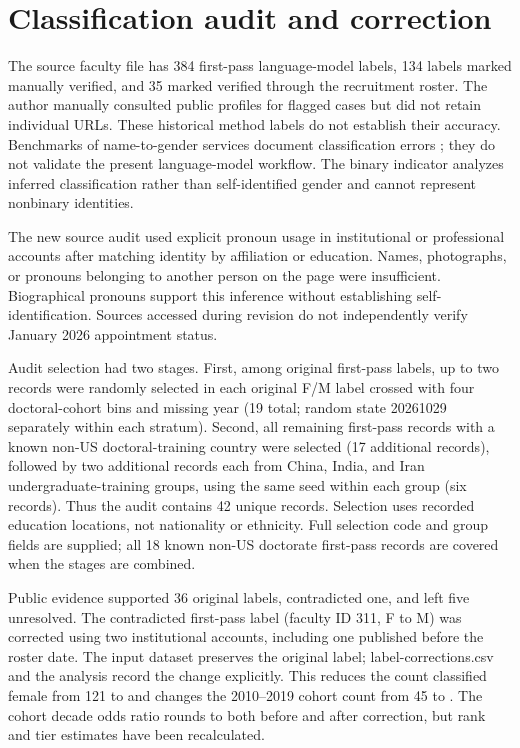 \documentclass[11pt]{article}
\begin{document}
\begin{table}[ht]\centering\small
\caption{Searched institutions with no transportation faculty identified under the study criteria.}

\end{table}

\section{Classification audit and correction}\label{sec:audit}
The source faculty file has 384 first-pass language-model labels, 134 labels marked manually verified, and 35 marked verified through the recruitment roster. The author manually consulted public profiles for flagged cases but did not retain individual URLs. These historical method labels do not establish their accuracy. Benchmarks of name-to-gender services document classification errors \citep{santamaria2018}; they do not validate the present language-model workflow. The binary indicator analyzes inferred classification rather than self-identified gender and cannot represent nonbinary identities.

The new source audit used explicit pronoun usage in institutional or professional accounts after matching identity by affiliation or education. Names, photographs, or pronouns belonging to another person on the page were insufficient. Biographical pronouns support this inference without establishing self-identification. Sources accessed during revision do not independently verify January 2026 appointment status.

Audit selection had two stages. First, among original first-pass labels, up to two records were randomly selected in each original F/M label crossed with four doctoral-cohort bins and missing year (19 total; random state 20261029 separately within each stratum). Second, all remaining first-pass records with a known non-US doctoral-training country were selected (17 additional records), followed by two additional records each from China, India, and Iran undergraduate-training groups, using the same seed within each group (six records). Thus the audit contains 42 unique records. Selection uses recorded education locations, not nationality or ethnicity. Full selection code and group fields are supplied; all 18 known non-US doctorate first-pass records are covered when the stages are combined.

Public evidence supported 36 original labels, contradicted one, and left five unresolved. The contradicted first-pass label (faculty ID 311, F to M) was corrected using two institutional accounts, including one published before the roster date. The input dataset preserves the original label; label-corrections.csv and the analysis record the change explicitly. This reduces the count classified female from 121 to \FemaleN{} and changes the 2010--2019 cohort count from 45 to \CohortThreeFemaleN. The cohort decade odds ratio rounds to \CohortOR{} both before and after correction, but rank and tier estimates have been recalculated.
\end{document}
